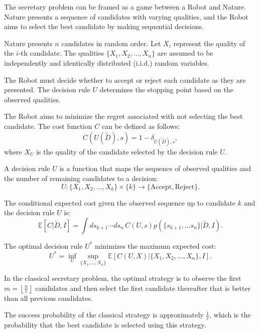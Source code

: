 \begin{example}
	
	The secretary problem can be framed as a game between a Robot and Nature. Nature presents a sequence of candidates with varying qualities, and the Robot aims to select the best candidate by making sequential decisions.
	
	
	Nature presents $n$ candidates in random order. Let $X_i$ represent the quality of the $i$-th candidate. The qualities $\{X_1, X_2, \ldots, X_n\}$ are assumed to be independently and identically distributed (i.i.d.) random variables.
	
	
	
	The Robot must decide whether to accept or reject each candidate as they are presented. The decision rule $U$ determines the stopping point based on the observed qualities.
	
	
	
	The Robot aims to minimize the regret associated with not selecting the best candidate. The cost function $C$ can be defined as follows:
	\begin{equation}
		C(U(\tilde{D}), s) = 1-\delta_{U(\tilde{D}),s},
	\end{equation}
	where $X_{U}$ is the quality of the candidate selected by the decision rule $U$.
	
	
	
	A decision rule $U$ is a function that maps the sequence of observed qualities and the number of remaining candidates to a decision:
	\begin{equation}
		U: \{X_1, X_2, \ldots, X_k\} \times \{k\} \rightarrow \{ \text{Accept}, \text{Reject} \}.
	\end{equation}
	
	
	
	The conditional expected cost given the observed sequence up to candidate $k$ and the decision rule $U$ is:
	\begin{equation}
		\mathbb{E}[C|\tilde{D}, I] = \int ds_{k+1} \cdots ds_n \, C(U, s) p(\{s_{k+1},\dots s_{n}\}|\tilde{D}, I).
	\end{equation}
	
	
	
	The optimal decision rule $U^*$ minimizes the maximum expected cost:
	\begin{equation}
		U^* = \inf_U \sup_{\{X_1, \ldots, X_n\}} \mathbb{E}[C(U, X)|\{X_1, X_2, \ldots, X_n\}, I].
	\end{equation}
	
	
	In the classical secretary problem, the optimal strategy is to observe the first $m = \left\lfloor \frac{n}{e} \right\rfloor$ candidates and then select the first candidate thereafter that is better than all previous candidates.
	
	
	
	The success probability of the classical strategy is approximately $\frac{1}{e}$, which is the probability that the best candidate is selected using this strategy.
	
\end{example}